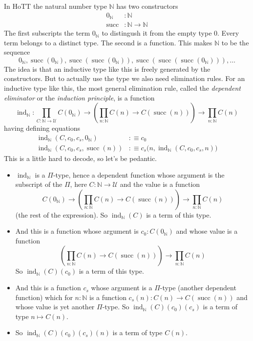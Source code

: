 \documentclass[11pt]{article}
\DeclareMathOperator{\successor}{succ}
\DeclareMathOperator{\inductor}{ind}
\newcommand{\nats}{\mathbb{N}}
\newcommand{\universe}{\mathcal{U}}
\begin{document}
In HoTT the natural number type $\nats$ has two constructors
\begin{align*}
   0_\nats & : \nats
   \\
   \successor & : \nats \to \nats
\end{align*}
The first subscripts the term $0_\nats$ to distingush it from the empty
type 0.  Every term belongs to a distinct type.
The second is a function.  This makes $\nats$ to be the sequence
$$
   0_\nats,
   \successor(0_\nats),
   \successor(\successor(0_\nats)),
   \successor(\successor(\successor(0_\nats))),
   \ldots
$$
The idea is that an inductive type like this is freely generated by
the constructors.  But to actually use the type we also need elimination
rules.  For an inductive type like this, the most general elimination rule,
called the \emph{dependent eliminator} or the \emph{induction principle},
is a function
\begin{equation}
\label{eq:natural-numbers-induction}
   \inductor_\nats : \prod_{C : \nats \to \universe}
   C(0_\nats) \to \left( \prod_{n : \nats} C(n) \to C(\successor(n)) \right)
   \to \prod_{n : \nats} C(n)
\end{equation}
having defining equations
\begin{subequations}
\begin{align}
   \inductor_\nats(C, c_0, c_s, 0_\nats) & :\equiv c_0
   \label{eq:nats-induction-base}
   \\
   \inductor_\nats(C, c_0, c_s, \successor(n)) & :\equiv
   c_s\bigl(n, \inductor_\nats(C, c_0, c_s, n) \bigr)
   \label{eq:nats-induction-succ}
\end{align}
\end{subequations}
This is a little hard to decode, so let's be pedantic.
\begin{itemize}
\item $\inductor_\nats$ is a $\Pi$-type,
    hence a dependent function whose argument is the subscript
    of the $\Pi$, here $C : \nats \to \universe$ and the value is a function
$$
   C(0_\nats) \to \left( \prod_{n : \nats} C(n) \to C(\successor(n)) \right)
   \to \prod_{n : \nats} C(n)
$$
   (the rest of the expression).
   So $\inductor_\nats(C)$ is a term of this type.
\item And this is a function whose argument is $c_0 : C(0_\nats)$ and
    whose value is a function
$$
   \left( \prod_{n : \nats} C(n) \to C(\successor(n)) \right)
   \to \prod_{n : \nats} C(n)
$$
    So $\inductor_\nats(C)(c_0)$ is a term of this type.
\item And this is a function $c_s$ whose argument is a $\Pi$-type
    (another dependent function) which for $n : \nats$ is a function
    $c_s(n) : C(n) \to C(\successor(n))$ and whose value is yet another
    $\Pi$-type.  So $\inductor_\nats(C)(c_0)(c_s)$ is a term of type
    $n \mapsto C(n)$.
\item
    So $\inductor_\nats(C)(c_0)(c_s)(n)$ is a term of type $C(n)$.
\end{itemize}
\end{document}
